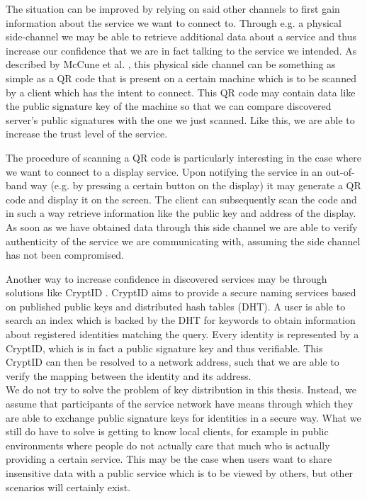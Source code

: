 The situation can be improved by relying on said other channels to first gain information about the service we want to connect to.
Through e.g. a physical side-channel we may be able to retrieve additional data about a service and thus increase our confidence that we are in fact talking to the service we intended.
As described by McCune et al. \cite{mccune2005seeing}, this physical side channel can be something as simple as a QR code that is present on a certain machine which is to be scanned by a client which has the intent to connect.
This QR code may contain data like the public signature key of the machine so that we can compare discovered server's public signatures with the one we just scanned.
Like this, we are able to increase the trust level of the service.

The procedure of scanning a QR code is particularly interesting in the case where we want to connect to a display service.
Upon notifying the service in an out-of-band way (e.g. by pressing a certain button on the display) it may generate a QR code and display it on the screen.
The client can subsequently scan the code and in such a way retrieve information like the public key and address of the display.
As soon as we have obtained data through this side channel we are able to verify authenticity of the service we are communicating with, assuming the side channel has not been compromised.

Another way to increase confidence in discovered services may be through solutions like CryptID \cite{malchow2015cryptid}.
CryptID aims to provide a secure naming services based on published public keys and distributed hash tables (DHT).
A user is able to search an index which is backed by the DHT for keywords to obtain information about registered identities matching the query.
Every identity is represented by a CryptID, which is in fact a public signature key and thus verifiable.
This CryptID can then be resolved to a network address, such that we are able to verify the mapping between the identity and its address.\\

We do not try to solve the problem of key distribution in this thesis.
Instead, we assume that participants of the service network have means through which they are able to exchange public signature keys for identities in a secure way.
What we still do have to solve is getting to know local clients, for example in public environments where people do not actually care that much who is actually providing a certain service.
This may be the case when users want to share insensitive data with a public service which is to be viewed by others, but other scenarios will certainly exist.

